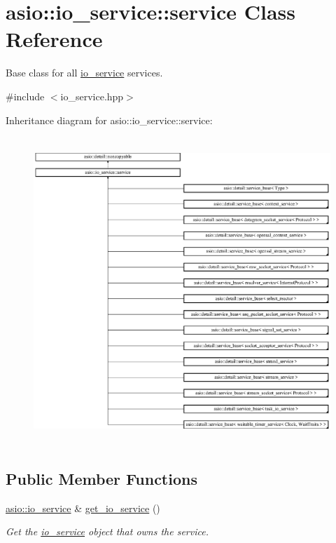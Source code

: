 \hypertarget{classasio_1_1io__service_1_1service}{}\section{asio\+:\+:io\+\_\+service\+:\+:service Class Reference}
\label{classasio_1_1io__service_1_1service}


Base class for all \hyperlink{classasio_1_1io__service}{io\+\_\+service} services.  




{\ttfamily \#include $<$io\+\_\+service.\+hpp$>$}

Inheritance diagram for asio\+:\+:io\+\_\+service\+:\+:service\+:\begin{figure}[H]
\begin{center}
\leavevmode
\includegraphics[height=11.612904cm]{classasio_1_1io__service_1_1service}
\end{center}
\end{figure}
\subsection*{Public Member Functions}
\begin{DoxyCompactItemize}
\item 
\hyperlink{classasio_1_1io__service}{asio\+::io\+\_\+service} \& \hyperlink{classasio_1_1io__service_1_1service_a4f70ce5f41425e67ac1a72cfff653485}{get\+\_\+io\+\_\+service} ()
\begin{DoxyCompactList}\small\item\em Get the \hyperlink{classasio_1_1io__service}{io\+\_\+service} object that owns the service. \end{DoxyCompactList}\end{DoxyCompactItemize}
